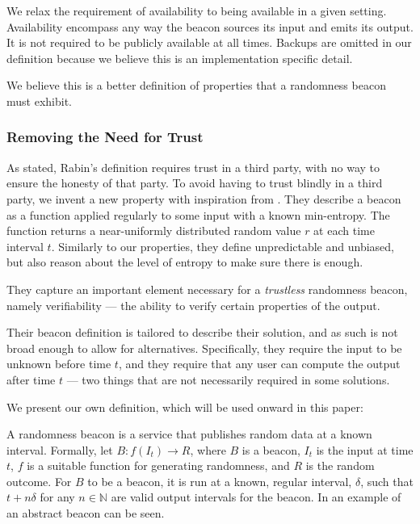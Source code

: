 We relax the requirement of availability to being available in a given setting.
Availability encompass any way the beacon sources its input and emits its output.
It is not required to be publicly available at all times.
Backups are omitted in our definition because we believe this is an implementation specific detail.

We believe this is a better definition of properties that a randomness beacon must exhibit.

\subsubsection{Removing the Need for Trust}
As stated, Rabin's definition requires trust in a third party, with no way to ensure the honesty of that party.
To avoid having to trust blindly in a third party, we invent a new property with inspiration from \citet{bonneau2015bitcoin}.
They describe a beacon as a function applied regularly to some input with a known min-entropy.
The function returns a near-uniformly distributed random value $r$ at each time interval $t$.
Similarly to our properties, they define unpredictable and unbiased, but also reason about the level of entropy to make sure there is enough.

They capture an important element necessary for a \emph{trustless} randomness beacon, namely verifiability --- the ability to verify certain properties of the output.

Their beacon definition is tailored to describe their solution, and as such is not broad enough to allow for alternatives.
Specifically, they require the input to be unknown before time $t$, and they require that any user can compute the output after time $t$ --- two things that are not necessarily required in some solutions.

We present our own definition, which will be used onward in this paper:

A randomness beacon is a service that publishes random data at a known interval.
Formally, let $B: f(I_t) \rightarrow R$, where $B$ is a beacon, $I_t$ is the input at time $t$, $f$ is a suitable function for generating randomness, and $R$ is the random outcome. %
For $B$ to be a beacon, it is run at a known, regular interval, $\delta$, such that $t+n\delta$ for any $n \in \mathbb{N}$ are valid output intervals for the beacon.
In  an example of an abstract beacon can be seen.

